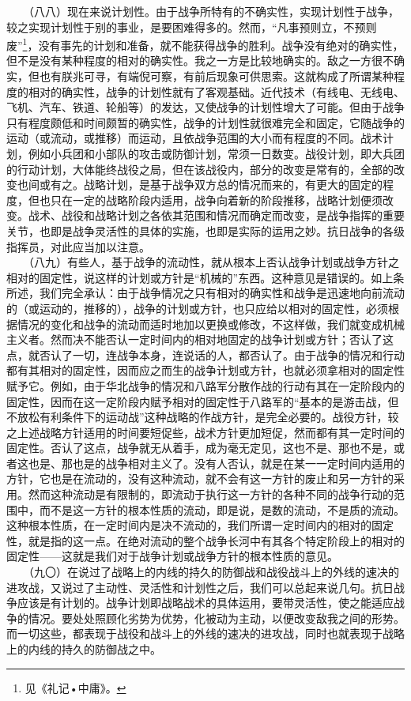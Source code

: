 \documentclass[cn,11pt,chinese]{elegantbook}
\begin{document}
　　（八八）现在来说计划性。由于战争所特有的不确实性，实现计划性于战争，较之实现计划性于别的事业，是要困难得多的。然而，“凡事预则立，不预则废”\footnote[38]{ 见《礼记•中庸》。}，没有事先的计划和准备，就不能获得战争的胜利。战争没有绝对的确实性，但不是没有某种程度的相对的确实性。我之一方是比较地确实的。敌之一方很不确实，但也有朕兆可寻，有端倪可察，有前后现象可供思索。这就构成了所谓某种程度的相对的确实性，战争的计划性就有了客观基础。近代技术（有线电、无线电、飞机、汽车、铁道、轮船等）的发达，又使战争的计划性增大了可能。但由于战争只有程度颇低和时间颇暂的确实性，战争的计划性就很难完全和固定，它随战争的运动（或流动，或推移）而运动，且依战争范围的大小而有程度的不同。战术计划，例如小兵团和小部队的攻击或防御计划，常须一日数变。战役计划，即大兵团的行动计划，大体能终战役之局，但在该战役内，部分的改变是常有的，全部的改变也间或有之。战略计划，是基于战争双方总的情况而来的，有更大的固定的程度，但也只在一定的战略阶段内适用，战争向着新的阶段推移，战略计划便须改变。战术、战役和战略计划之各依其范围和情况而确定而改变，是战争指挥的重要关节，也即是战争灵活性的具体的实施，也即是实际的运用之妙。抗日战争的各级指挥员，对此应当加以注意。\\
　　（八九）有些人，基于战争的流动性，就从根本上否认战争计划或战争方针之相对的固定性，说这样的计划或方针是“机械的”东西。这种意见是错误的。如上条所述，我们完全承认：由于战争情况之只有相对的确实性和战争是迅速地向前流动的（或运动的，推移的），战争的计划或方针，也只应给以相对的固定性，必须根据情况的变化和战争的流动而适时地加以更换或修改，不这样做，我们就变成机械主义者。然而决不能否认一定时间内的相对地固定的战争计划或方针；否认了这点，就否认了一切，连战争本身，连说话的人，都否认了。由于战争的情况和行动都有其相对的固定性，因而应之而生的战争计划或方针，也就必须拿相对的固定性赋予它。例如，由于华北战争的情况和八路军分散作战的行动有其在一定阶段内的固定性，因而在这一定阶段内赋予相对的固定性于八路军的“基本的是游击战，但不放松有利条件下的运动战”这种战略的作战方针，是完全必要的。战役方针，较之上述战略方针适用的时间要短促些，战术方针更加短促，然而都有其一定时间的固定性。否认了这点，战争就无从着手，成为毫无定见，这也不是、那也不是，或者这也是、那也是的战争相对主义了。没有人否认，就是在某一一定时间内适用的方针，它也是在流动的，没有这种流动，就不会有这一方针的废止和另一方针的采用。然而这种流动是有限制的，即流动于执行这一方针的各种不同的战争行动的范围中，而不是这一方针的根本性质的流动，即是说，是数的流动，不是质的流动。这种根本性质，在一定时间内是决不流动的，我们所谓一定时间内的相对的固定性，就是指的这一点。在绝对流动的整个战争长河中有其各个特定阶段上的相对的固定性——这就是我们对于战争计划或战争方针的根本性质的意见。\\
　　（九〇）在说过了战略上的内线的持久的防御战和战役战斗上的外线的速决的进攻战，又说过了主动性、灵活性和计划性之后，我们可以总起来说几句。抗日战争应该是有计划的。战争计划即战略战术的具体运用，要带灵活性，使之能适应战争的情况。要处处照顾化劣势为优势，化被动为主动，以便改变敌我之间的形势。而一切这些，都表现于战役和战斗上的外线的速决的进攻战，同时也就表现于战略上的内线的持久的防御战之中。\\
\end{document}
